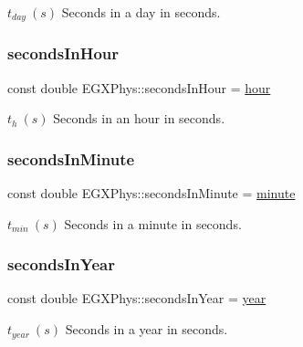 $t_{day}\ (s)$ Seconds in a day in seconds. \mbox{\label{namespace_e_g_x_phys_a9a6a4eb13636aa068a3f1e41cde4d6fd}} 
\subsubsection{\texorpdfstring{seconds\+In\+Hour}{secondsInHour}}
{\footnotesize\ttfamily const double E\+G\+X\+Phys\+::seconds\+In\+Hour = \hyperlink{namespace_e_g_x_phys_a85c64ea70cddbb7e4c96adcc01cef6e2}{hour}}

$t_{h}\ (s)$ Seconds in an hour in seconds. \mbox{\label{namespace_e_g_x_phys_a65038e0b58235dc59a44cec16638df35}} 
\subsubsection{\texorpdfstring{seconds\+In\+Minute}{secondsInMinute}}
{\footnotesize\ttfamily const double E\+G\+X\+Phys\+::seconds\+In\+Minute = \hyperlink{namespace_e_g_x_phys_ab3a72a63e9c502847d0db88a167dc02b}{minute}}

$t_{min}\ (s)$ Seconds in a minute in seconds. \mbox{\label{namespace_e_g_x_phys_aac13efe8296819409bde4a0a8691d56a}} 
\subsubsection{\texorpdfstring{seconds\+In\+Year}{secondsInYear}}
{\footnotesize\ttfamily const double E\+G\+X\+Phys\+::seconds\+In\+Year = \hyperlink{namespace_e_g_x_phys_afee9eebc1da4a1db2198fe0c45bcb53f}{year}}

$t_{year}\ (s)$ Seconds in a year in seconds. \mbox{\label{namespace_e_g_x_phys_ad1bdca5cec4a0f4a4b8a18ead61de6d9}} 
